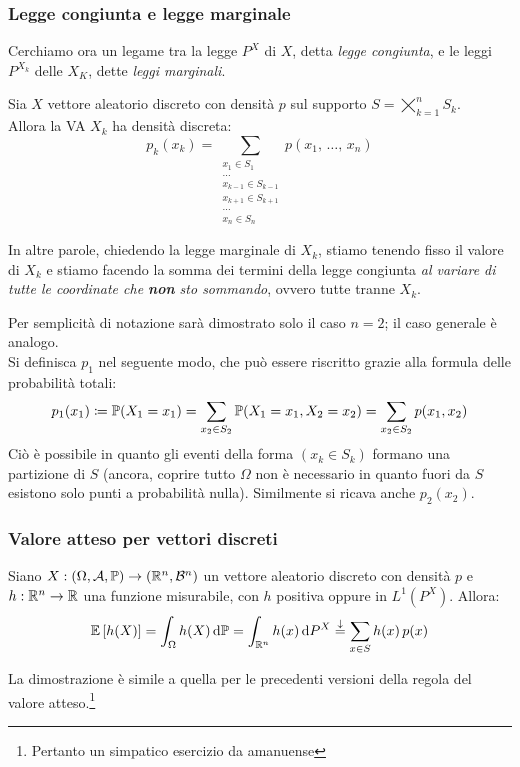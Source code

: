 \subsubsection{Legge congiunta e legge marginale}

Cerchiamo ora un legame tra la legge $P^X$ di $X$, detta \textit{legge congiunta}, e le leggi $P^{X_k}$ delle $X_K$, dette \textit{leggi marginali}.
\begin{prop}
  Sia $X$ vettore aleatorio discreto con densità $p$ sul supporto $S = \bigtimes\limits_{k=1}^n S_k$. \\
  Allora la VA $X_k$ ha densità discreta:
  $$p_k(x_k) = \sum_{ \substack
    {x_1 \in S_1 \\ \dots \\
    x_{k-1} \in S_{k-1} \\
    x_{k+1} \in S_{k+1} \\ \dots \\
    x_n \in S_n}}
  p(x_1, \, \dots, \, x_n)$$
\end{prop}

In altre parole, chiedendo la legge marginale di $X_k$, stiamo tenendo fisso il valore di $X_k$ e stiamo facendo la somma dei termini della legge congiunta \emph{al variare di tutte le coordinate che \textbf{non} sto sommando}, ovvero tutte tranne $X_k$.

\begin{dimo}
  Per semplicità di notazione sarà dimostrato solo il caso $n = 2$; il caso generale è analogo. \\
  Si definisca $p_1$ nel seguente modo, che può essere riscritto grazie alla formula delle probabilità totali:
  $$p_1(x_1) \coloneqq \mathbb P(X_1 = x_1) = \sum_{x_2 \in S_2} \mathbb P(X_1 = x_1, X_2 = x_2) = \sum_{x_2 \in S_2} p(x_1, x_2)$$
  Ciò è possibile in quanto gli eventi della forma $(x_k \in S_k)$ formano una partizione di $S$ (ancora, coprire tutto $\Omega$ non è necessario in quanto fuori da $S$ esistono solo punti a probabilità nulla). Similmente si ricava anche $p_2(x_2)$.
\end{dimo}

\subsubsection{Valore atteso per vettori discreti}

\begin{prop}
  Siano $X: \DoCo$ un vettore aleatorio discreto con densità $p$ e $h:\mathbb R^n \to \mathbb R$ una funzione misurabile, con $h$ positiva oppure in $L^1(P^X)$. Allora:
  $$ \mathbb E \left[ h(X) \right] = \int_\Omega h(X) \, \mathrm d \mathbb P = \int_{\mathbb R^n} h(x) \, \mathrm d P^X \stackrel{\downarrow}{=} \sum_{x \in S} h(x) \, p(x)$$
\end{prop}
La dimostrazione è simile a quella per le precedenti versioni della regola del valore atteso.\footnote{Pertanto un simpatico esercizio da amanuense}

